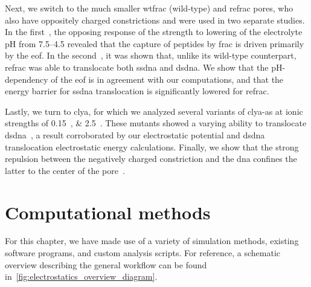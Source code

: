 Next, we switch to the much smaller \gls{wtfrac} (wild-type) and \gls{refrac} pores, who also have oppositely
charged constrictions and were used in two separate studies. In the first~\cite{Huang-2017}, the opposing
response of the  strength to lowering of the electrolyte pH from \numrange{7.5}{4.5} revealed
that the capture of peptides by \gls{frac} is driven primarily by the \gls{eof}. In the
second~\cite{Wloka-2016}, it was shown that, unlike its wild-type counterpart, \gls{refrac} was able to
translocate both \gls{ssdna} and \gls{dsdna}. We show that the pH-dependency of the \gls{eof} is in agreement
with our computations, and that the energy barrier for \gls{ssdna} translocation is significantly lowered for
\gls{refrac}.

Lastly, we turn to \gls{clya}, for which we analyzed several variants of \gls{clya-as} at ionic strengths of
\SIlist{0.15;2.5}{\Molar}. These mutants showed a varying ability to translocate
\gls{dsdna}~\cite{Franceschini-2016}, a result corroborated by our electrostatic potential and \gls{dsdna}
translocation electrostatic energy calculations. Finally, we show that the strong repulsion between the
negatively charged constriction and the \gls{dna} confines the latter to the center of the
pore~\cite{Bayoumi-2020}.









%
%
\clearpage
%
%


%
%
\section{Computational methods}
%
\label{sec:elec:methods}
%

For this chapter, we have made use of a variety of simulation methods, existing software programs, and custom
analysis scripts. For reference, a schematic overview describing the general workflow can be found
in~\cref{fig:electrostatics_overview_diagram}.

